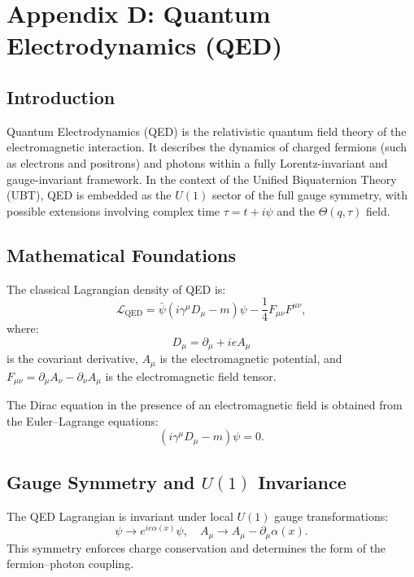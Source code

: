 
\appendix
\section*{Appendix D: Quantum Electrodynamics (QED)}

\subsection*{Introduction}
Quantum Electrodynamics (QED) is the relativistic quantum field theory of the electromagnetic interaction. 
It describes the dynamics of charged fermions (such as electrons and positrons) and photons within a fully 
Lorentz-invariant and gauge-invariant framework. In the context of the Unified Biquaternion Theory (UBT), 
QED is embedded as the $U(1)$ sector of the full gauge symmetry, with possible extensions involving 
complex time $\tau = t + i\psi$ and the $\Theta(q,\tau)$ field.

\subsection*{Mathematical Foundations}
The classical Lagrangian density of QED is:
\begin{equation}
\mathcal{L}_{\text{QED}} = \bar{\psi}(i\gamma^\mu D_\mu - m)\psi - \frac{1}{4}F_{\mu\nu}F^{\mu\nu},
\end{equation}
where:
\begin{equation}
D_\mu = \partial_\mu + ieA_\mu
\end{equation}
is the covariant derivative, $A_\mu$ is the electromagnetic potential, and 
$F_{\mu\nu} = \partial_\mu A_\nu - \partial_\nu A_\mu$ is the electromagnetic field tensor.

The Dirac equation in the presence of an electromagnetic field is obtained from the Euler–Lagrange equations:
\begin{equation}
(i\gamma^\mu D_\mu - m)\psi = 0.
\end{equation}

\subsection*{Gauge Symmetry and $U(1)$ Invariance}
The QED Lagrangian is invariant under local $U(1)$ gauge transformations:
\begin{equation}
\psi \rightarrow e^{i e \alpha(x)}\psi, \quad A_\mu \rightarrow A_\mu - \partial_\mu \alpha(x).
\end{equation}
This symmetry enforces charge conservation and determines the form of the fermion–photon coupling.

